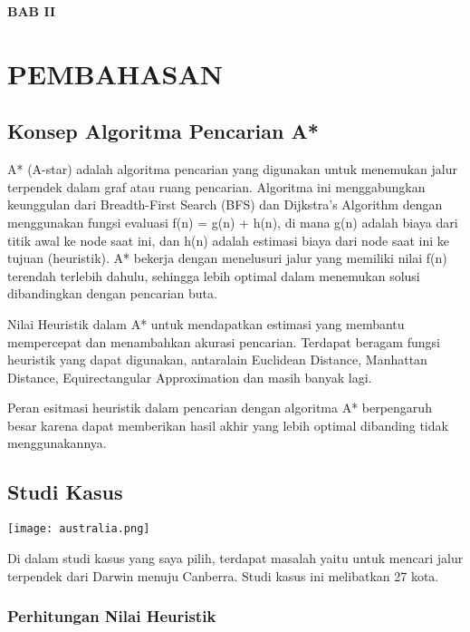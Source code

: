 \documentclass[12pt,a4paper]{article}
\begin{document}
\newpage

\begin{center}
  \large{\textbf{BAB II}}

  \section*{PEMBAHASAN}
\end{center}
\vspace{1cm}

\subsection{Konsep Algoritma Pencarian A*}

A* (A-star) adalah algoritma pencarian yang digunakan untuk menemukan jalur
terpendek dalam graf atau ruang pencarian. Algoritma ini menggabungkan
keunggulan dari Breadth-First Search (BFS) dan Dijkstra’s Algorithm
dengan menggunakan fungsi evaluasi f(n) = g(n) + h(n), di mana g(n)
adalah biaya dari titik awal ke node saat ini, dan h(n) adalah estimasi
biaya dari node saat ini ke tujuan (heuristik). A* bekerja dengan menelusuri
jalur yang memiliki nilai f(n) terendah terlebih dahulu, sehingga lebih optimal
dalam menemukan solusi dibandingkan dengan pencarian buta.

Nilai Heuristik dalam A* untuk mendapatkan estimasi yang membantu
mempercepat dan menambahkan akurasi pencarian.
Terdapat beragam fungsi heuristik yang dapat digunakan, antaralain Euclidean
Distance, Manhattan Distance, Equirectangular Approximation dan masih
banyak lagi.

Peran esitmasi heuristik dalam pencarian dengan algoritma A* berpengaruh
besar karena dapat memberikan hasil akhir yang lebih optimal dibanding
tidak menggunakannya.

\subsection{Studi Kasus} 

\begin{center}
\texttt{[image: australia.png]}
\end{center}

Di dalam studi kasus yang saya pilih, terdapat masalah yaitu
untuk mencari jalur terpendek dari Darwin menuju Canberra. Studi kasus
ini melibatkan 27 kota.

\subsubsection{Perhitungan Nilai Heuristik}
\end{document}
